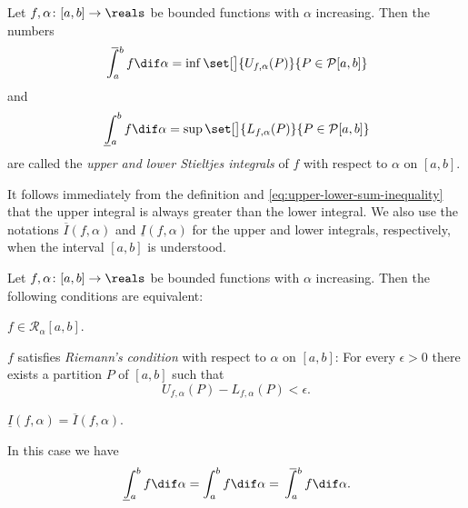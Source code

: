 \documentclass[article, a4paper, 11pt, oneside]{memoir}
\numberwithin{equation}{chapter}
\newcommand{\calP}{\mathcal{P}}
\newcommand{\calR}{\mathcal{R}}
\begin{document}
\begin{definition}
    Let $f, \alpha \colon [a,b] \to \reals$ be bounded functions with $\alpha$ increasing. Then the numbers
    \begin{equation*}
        \upint_a^b f \dif\alpha
            = \inf \set[\big]{U_{f,\alpha}(P)}{P \in \calP[a,b]}
    \end{equation*}
    and
    \begin{equation*}
        \lowint_a^b f \dif\alpha
            = \sup \set[\big]{L_{f,\alpha}(P)}{P \in \calP[a,b]}
    \end{equation*}
    are called the \emph{upper and lower Stieltjes integrals} of $f$ with respect to $\alpha$ on $[a,b]$.
\end{definition}
%
It follows immediately from the definition and \cref{eq:upper-lower-sum-inequality} that the upper integral is always greater than the lower integral. We also use the notations $\overline{I}(f,\alpha)$ and $\underline{I}(f,\alpha)$ for the upper and lower integrals, respectively, when the interval $[a,b]$ is understood.


\begin{theorem}
    Let $f,\alpha \colon [a,b] \to \reals$ be bounded functions with $\alpha$ increasing. Then the following conditions are equivalent:
    \begin{enumthm}
        \item \label{enum:integrability} $f \in \calR_\alpha[a,b]$.
        \item \label{enum:Riemanns-condition} $f$ satisfies \emph{Riemann's condition} with respect to $\alpha$ on $[a,b]$: For every $\epsilon > 0$ there exists a partition $P$ of $[a,b]$ such that
        \begin{equation}
            \label{eq:Riemanns-condition}
            U_{f,\alpha}(P) - L_{f,\alpha}(P) < \epsilon.
        \end{equation}
        \item \label{enum:upper-lower-integrals-equal} $\underline{I}(f,\alpha) = \overline{I}(f,\alpha)$.
    \end{enumthm}
    In this case we have
    \begin{equation*}
        \lowint_a^b f \dif\alpha
            = \int_a^b f \dif\alpha
            = \upint_a^b f \dif\alpha.
    \end{equation*}
\end{theorem}
\end{document}
